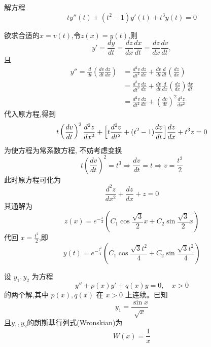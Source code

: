 \begin{questions}
    \question 解方程
    \[
    t y''(t) + (t^2-1) y'(t) + t^3 y(t) = 0
    \]
    \begin{solution}
        欲求合适的$x=v(t)$,令$z(x)=y(t)$,则
        \[
        y'=\frac{dy}{dt}=\frac{dz}{dx}\frac{dx}{dt}=\frac{dz}{dx}\frac{dv}{dt},
        \]
        且
        \begin{align*}
        y'' = \frac{d}{dt}\left(\frac{dv}{dt}\frac{dz}{dx}\right) 
        &= \frac{d^2v}{dt^2}\frac{dz}{dx} + \frac{dv}{dt}\frac{d}{dt}\left(\frac{dz}{dx}\right) \\
        &= \frac{d^2v}{dt^2}\frac{dz}{dx} + \frac{dv}{dt}\frac{d}{dx}\left(\frac{dz}{dx}\right)\frac{dx}{dt} \\
        &= \frac{d^2v}{dt^2}\frac{dz}{dx} + \left(\frac{dv}{dt}\right)^2\frac{d^2z}{dx^2}
        \end{align*}
        代入原方程,得到
        \[
        t\left(\frac{dv}{dt}\right)^2 \frac{d^2z}{dx^2} + \Bigl[t\frac{d^2v}{dt^2} + (t^2-1)\frac{dv}{dt}\Bigr]\frac{dz}{dx} + t^3 z = 0
        \]
        为使方程为常系数方程, 不妨考虑变换
        \[
        t\left(\frac{dv}{dt}\right)^2 = t^3 \Rightarrow \frac{dv}{dt} = t \Rightarrow v = \frac{t^2}{2}
        \]
        此时原方程可化为
        \[
        \frac{d^2z}{dx^2} + \frac{dz}{dx} + z = 0
        \]
        其通解为
        \[
        z(x) = e^{-\frac{x}{2}}\left(C_1 \cos \frac{\sqrt{3}}{2}x + C_2 \sin \frac{\sqrt{3}}{2}x\right)
        \]
        代回 $x=\frac{t^2}{2}$,即
        \[
        y(t) = e^{-\frac{t^2}{4}}\left(C_1 \cos \frac{\sqrt{3} t^2}{4} + C_2 \sin \frac{\sqrt{3} t^2}{4}\right)
        \]
    \end{solution}

    \question 设 $y_1,y_2$ 为方程
    \[
    y'' + p(x)y' + q(x)y = 0,\quad x>0 \tag{1}
    \]
    的两个解,其中 $p(x),q(x)$ 在 $x>0$ 上连续。已知
    \[
    y_1 = \frac{\sin x}{\sqrt{x}}
    \]
    且$y_1,y_2$的朗斯基行列式(Wronskian)为
    \[
    W(x)=\frac{1}{x}
    \]
    \begin{parts}

\end{parts}
\end{questions}
